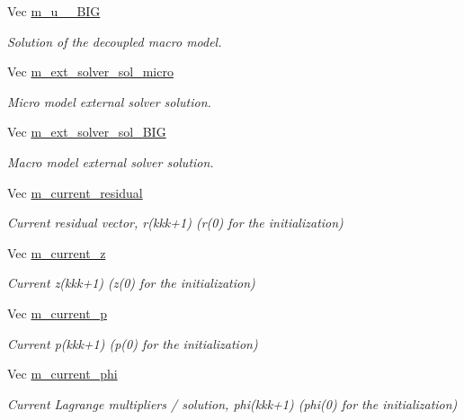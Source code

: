 \begin{DoxyCompactItemize}
Vec \hyperlink{classcarl_1_1_f_e_t_i___operations_ad8097151d30d2d9b8acd6bc67caffcf4}{m\+\_\+u\+\_\+\_\+\+B\+I\+G}
\begin{DoxyCompactList}\small\item\em Solution of the decoupled macro model. \end{DoxyCompactList}\item 
Vec \hyperlink{classcarl_1_1_f_e_t_i___operations_a4e2a843baafa4a006fe429c2c82c466f}{m\+\_\+ext\+\_\+solver\+\_\+sol\+\_\+micro}
\begin{DoxyCompactList}\small\item\em Micro model external solver solution. \end{DoxyCompactList}\item 
Vec \hyperlink{classcarl_1_1_f_e_t_i___operations_a2dc346bc628b1639c0aaa9f3b0c5852d}{m\+\_\+ext\+\_\+solver\+\_\+sol\+\_\+\+B\+I\+G}
\begin{DoxyCompactList}\small\item\em Macro model external solver solution. \end{DoxyCompactList}\item 
Vec \hyperlink{classcarl_1_1_f_e_t_i___operations_a6b1154885f5b8303ecbd32ea76df40e5}{m\+\_\+current\+\_\+residual}
\begin{DoxyCompactList}\small\item\em Current residual vector, {\ttfamily r(kkk+1)} ({\ttfamily r(0)} for the initialization) \end{DoxyCompactList}\item 
Vec \hyperlink{classcarl_1_1_f_e_t_i___operations_a56038a186d124078ad4b37c631f50ff0}{m\+\_\+current\+\_\+z}
\begin{DoxyCompactList}\small\item\em Current {\ttfamily z(kkk+1)} ({\ttfamily z(0)} for the initialization) \end{DoxyCompactList}\item 
Vec \hyperlink{classcarl_1_1_f_e_t_i___operations_a9800bde926511daa705bd6bbdd2e2451}{m\+\_\+current\+\_\+p}
\begin{DoxyCompactList}\small\item\em Current {\ttfamily p(kkk+1)} ({\ttfamily p(0)} for the initialization) \end{DoxyCompactList}\item 
Vec \hyperlink{classcarl_1_1_f_e_t_i___operations_ac0f0857e6070cde78612b0ce5e1005e8}{m\+\_\+current\+\_\+phi}
\begin{DoxyCompactList}\small\item\em Current Lagrange multipliers / solution, {\ttfamily phi(kkk+1)} ({\ttfamily phi(0)} for the initialization) \end{DoxyCompactList}\item 

\end{DoxyCompactItemize}
